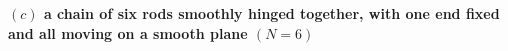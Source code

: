 \begin{comment}
\end{array}\right.\\
&=\left( \mathbf{\sum}\rho  \left(\omega_uz_nz_n-\omega_kz_uz_k\right)\right)\left( \mathbf{\sum}\rho  \left(\omega_vz_nz_n-\omega_rz_vz_r\right)\right)d\omega_{u} d\omega_{v}\\
&=\left( \mathbf{\sum}\rho  \left(\delta_{ku}\omega_kz_nz_n-\omega_kz_uz_k\right)\right)\left( \mathbf{\sum}\rho  \left(\delta_{rv}\omega_rz_nz_n-\omega_rz_vz_r\right)\right)d\omega_{u} d\omega_{v}\\
&=\left( \mathbf{\sum}\rho  \left(\delta_{ku}z_nz_n-z_uz_k\right)\right)\left( \mathbf{\sum}\rho  \left(\delta_{rv}z_nz_n-z_vz_r\right)\right)\omega_k\omega_rd\omega_{u} d\omega_{v}
\end{align}
By $\mathbf{5.335.}$ we have $ I_{ku} = \delta_{ku}\mathbf{\sum}\rho z_nz_n-\mathbf{\sum}\rho z_uz_k$ and so (13) can be written as
\begin{align}
dT^2&=I_{ku}I_{rv}\omega_k\omega_rd\omega_{u} d\omega_{v}
\end{align} 
So we can choose the three $\omega_k$ as generalized coordinates and define $$ds^2=a_{mn}d\omega_{m} d\omega_{n}$$ with  $$a_{mn} = I_{km}I_{rn}\omega_k \omega_r$$
The metric tensor $a_{mn}$ contains elements depending on the $\omega_k$ chosen as general coordinates of the system and is a good candidate as metric tensor.
Some check on consistency of the metric tensor defined by $(14)$:\\
\textbf{Positive definite ?} : Yes, as $dT^2$ is positive.\\
\textbf{Symmetric ?} : Yes, as $a_{mn} = I_{km}I_{rn}\omega_k \omega_r = I_{rn}I_{km}\omega_k \omega_r= a_{nm}$\\
\end{comment}
\\\\ \textbf{$(c)$ a chain of six rods smoothly hinged together, with one end fixed and all moving on a smooth plane $(N=6)$}\\

